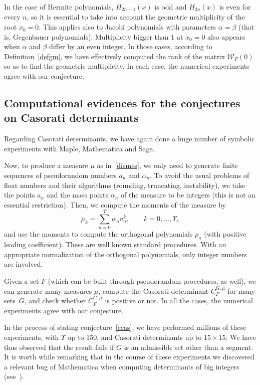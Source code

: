 \documentclass[10pt]{article}
\theoremstyle{plain}
\theoremstyle{definition}
\numberwithin{equation}{section} %
\newcommand\W{\mathcal{W}}
\begin{document}
In the case of Hermite polynomials, $H_{2n+1}(x)$ is odd and $H_{2n}(x)$ is even for every $n$, so it is essential to take into account the geometric multiplicity of the root $x_0=0$.
This applies also to Jacobi polynomials with parameters $\alpha=\beta$ (that is, Gegenbauer polynomials). Multiplicity bigger than $1$ at $x_0=0$ also appears when $\alpha$ and $\beta$ differ by an even integer.
In those cases, according to Definition~\ref{defgm}, we have effectively computed the rank of the matrix $\W_F(0)$ so as to find the geometric multiplicity. In each case, the numerical experiments agree with our conjecture.

\subsection{Computational evidences for the conjectures on Casorati determinants}

Regarding Casorati determinants, we have again done a huge number of symbolic experiments with Maple, Mathematica and Sage.

Now, to produce a measure $\mu$ as in~\eqref{dismes}, we only need to generate finite sequences of pseudorandom numbers $a_n$ and $\alpha_n$.
To avoid the usual problems of float numbers and their algorithms (rounding, truncating, instability), we take the points $a_n$ and the mass points $\alpha_n$ of the measure to be integers (this is not an essential restriction). Then, we compute the moments of the measure by
\[
  \mu_k = \sum_{n=0}^{\Upsilon} \alpha_n a_n^k, \qquad k = 0,\dots, \Upsilon,
\]
and use the moments to compute the orthogonal polynomials $p_n$ (with positive leading coefficient). These are well known standard procedures. With an appropriate normalization of the orthogonal polynomials, only integer numbers are involved.

Given a set $F$ (which can be built through pseudorandom procedures, as well), we can generate many measures $\mu$, compute the Casorati determinant $C_F^{G,\mu}$ for many sets~$G$, and check whether $C_F^{G,\mu}$ is positive or not. In all the cases, the numerical experiments agree with our conjecture.

In the process of stating conjecture~\ref{ccas}, we have performed millions of these experiments, with $\Upsilon$ up to $150$, and Casorati determinants up to $15 \times 15$. We have thus observed that the result fails if $G$ is an admissible set other than a segment. It is worth while remarking that in the course of these experiments we discovered a relevant bug of Mathematica when computing determinants of big integers (see~\cite{DPV}).
\end{document}
